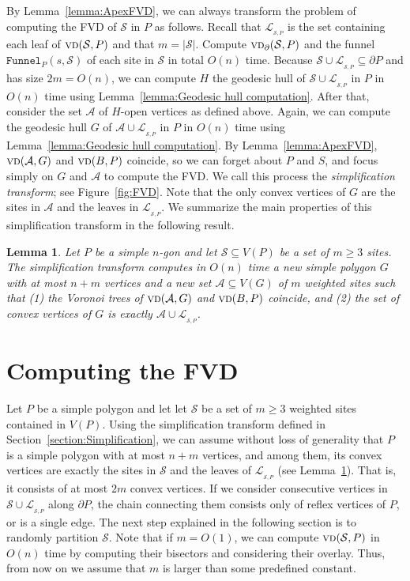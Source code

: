 \documentclass[a4paper, 11pt]{article}
\newtheorem{lemma}[theorem]{Lemma}
\newcommand{\s}{\mathcal S}
\newcommand{\funnel}[2][P]{\ensuremath{\mathtt{Funnel}_{\scriptscriptstyle #1}(#2)}}
\newcommand{\vd}[2][P]{\textsc{vd}(#2, #1)}
\newcommand{\bvd}[2][P]{\textsc{vd}_{\partial}(#2, #1)}
\newcommand{\LL}[1][\s, P]{\ensuremath{\mathcal L_{_{#1}}}}
\newcommand{\A}{\ensuremath{\mathcal A}}
\begin{document}
By Lemma~\ref{lemma:ApexFVD}, we can always transform the problem of computing the FVD of $\s$ in $P$ as follows. 
Recall that $\LL$ is the set containing each leaf of $\vd{\s}$ and that $m= |\s|$.
Compute $\bvd{\s}$ and the funnel $\funnel{s, \s}$ of each site in $\s$ in total $O(n)$ time. 
Because $\s\cup \LL\subseteq \partial P$ and has size $2 m = O(n)$, we can compute $H$ the geodesic hull of $\s\cup \LL$ in $P$ in $O(n)$ time using Lemma~\ref{lemma:Geodesic hull computation}. 
After that, consider the set $\A$ of $H$-open vertices as defined above.
Again, we can compute the geodesic hull $G$ of $\A\cup \LL$ in $P$ in $O(n)$ time using Lemma~\ref{lemma:Geodesic hull computation}. 
By Lemma~\ref{lemma:ApexFVD}, $\vd[G]{\A}$ and $\vd[P]{B}$ coincide, so we can forget about $P$ and $S$, and focus simply on $G$ and $\A$ to compute the FVD.
We call this process the \emph{simplification transform}; see Figure~\ref{fig:FVD}. 
Note that the only convex vertices of $G$ are the sites in $\A$ and the leaves in $\LL$. 
We summarize the main properties of this simplification transform in the following result.

\begin{lemma}\label{lemma:Properties of simplification}
Let  $P$ be a simple $n$-gon and let $\s\subseteq V(P)$ be a set of $m\geq 3$ sites.
The simplification transform computes in $O(n)$ time a new simple polygon $G$ with at most $n+m$ vertices and a new set $\A\subseteq V(G)$ of $m$ weighted sites such that (1) the Voronoi trees of $\vd[G]{\A}$ and $\vd[P]{B}$ coincide, and (2) the set of convex vertices of $G$ is exactly $\A\cup \LL$.
\end{lemma}



\section{Computing the FVD}
Let  $P$ be a simple polygon and let let $\s$ be a set of $m\geq 3$ weighted sites contained in $V(P)$.
Using the simplification transform defined in Section~\ref{section:Simplification}, we can assume without loss of generality that $P$ is a simple polygon with at most $n+m$ vertices, and among them, its convex vertices are exactly the sites in $\s$ and the leaves of $\LL$ (see Lemma~\ref{lemma:Properties of simplification}). 
That is, it consists of at most $2m$ convex vertices.
If we consider consecutive vertices in $\s\cup \LL$ along $\partial P$, the chain connecting them consists only of reflex vertices of $P$, or is a single edge. 
The next step explained in the following section is to randomly partition $\s$.
Note that if $m = O(1)$, we can compute $\vd{\s}$ in $O(n)$ time by computing their bisectors and considering their overlay. Thus, from now on we assume that $m$ is larger than some predefined constant.
\end{document}
